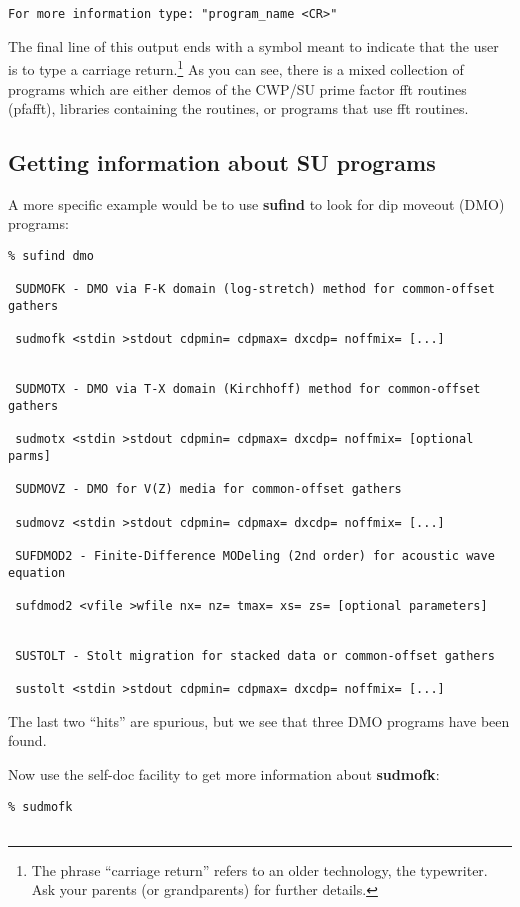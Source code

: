{{{\begin{verbatim}
For more information type: "program_name <CR>"
\end{verbatim}}\noindent
The final line of this output ends with a symbol meant to indicate that the 
user is to type a carriage return.\footnote{The 
phrase ``carriage return'' refers to an older technology, the typewriter.
Ask your parents (or grandparents) for further details.}
As you can see, there is a mixed collection of programs which 
are either demos of the CWP/SU prime factor fft routines (pfafft),
libraries containing the routines, or programs that use fft routines.

\subsection{Getting information about SU programs}

A more specific example would be to use
{\bf sufind\/} to look for dip moveout (DMO) programs:
{\small\begin{verbatim}
% sufind dmo

 SUDMOFK - DMO via F-K domain (log-stretch) method for common-offset gathers

 sudmofk <stdin >stdout cdpmin= cdpmax= dxcdp= noffmix= [...]           


 SUDMOTX - DMO via T-X domain (Kirchhoff) method for common-offset gathers

 sudmotx <stdin >stdout cdpmin= cdpmax= dxcdp= noffmix= [optional parms]

 SUDMOVZ - DMO for V(Z) media for common-offset gathers

 sudmovz <stdin >stdout cdpmin= cdpmax= dxcdp= noffmix= [...]     

 SUFDMOD2 - Finite-Difference MODeling (2nd order) for acoustic wave equation

 sufdmod2 <vfile >wfile nx= nz= tmax= xs= zs= [optional parameters]     


 SUSTOLT - Stolt migration for stacked data or common-offset gathers    

 sustolt <stdin >stdout cdpmin= cdpmax= dxcdp= noffmix= [...]           
\end{verbatim}}\noindent
The last two ``hits'' are spurious,
but we see that three DMO programs have been found.

Now use the self-doc facility to get more information about {\bf sudmofk\/}:
{\small\begin{verbatim}
% sudmofk
                                                                        

\end{verbatim}}}}

